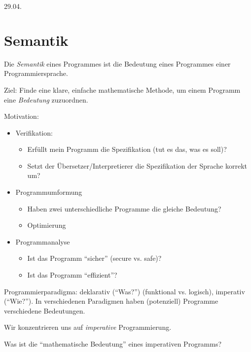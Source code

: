 \newpage
\hfill 29.04.

\section{Semantik} \label{sec:semantik}

Die \emph{Semantik} eines Programmes ist die Bedeutung eines Programmes einer Programmiersprache.

Ziel: Finde eine klare, einfache mathematische Methode, um einem Programm eine \emph{Bedeutung} zuzuordnen.

Motivation:
\begin{itemize}
    \item Verifikation:
        \begin{itemize}
            \item Erfüllt mein Programm die Spezifikation (tut es das, was es soll)?
            \item Setzt der Übersetzer/Interpretierer die Spezifikation der Sprache korrekt um?
        \end{itemize}
     \item Programmumformung
        \begin{itemize}
            \item Haben zwei unterschiedliche Programme die gleiche Bedeutung?
            \item Optimierung
        \end{itemize}
    \item Programmanalyse
        \begin{itemize}
            \item Ist das Programm ``sicher'' (secure vs. safe)?
            \item Ist das Programm ``effizient''?
        \end{itemize}
\end{itemize}

\begin{definition}[Programmierparadigma]
    Programmierparadigma: \zb{} deklarativ (``Was?'') (funktional vs. logisch), imperativ (``Wie?''). In verschiedenen Paradigmen haben (potenziell) Programme verschiedene Bedeutungen.
\end{definition}

Wir konzentrieren uns auf \emph{imperative} Programmierung.

\begin{question}
    Was ist die ``mathematische Bedeutung'' eines imperativen Programms?
\end{question}

